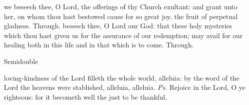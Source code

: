\secret
{} we beseech thee, O Lord, the offerings of thy Church exultant: and grant unto her, on whom thou hast bestowed cause for so great joy, the fruit of perpetual gladness. Through.
\postcommunion
{} beseech thee, O Lord our God: that these holy mysteries which thou hast given us for the assurance of our redemption; may avail for our healing both in this life and in that which is to come. Through.

\label{EasterII}
\begin{inhead}
    {Semidouble}
\end{inhead}
\par\noindent
{}


\properantiphonfix

\introit
{} loving-kindness of the Lord filleth the whole world, alleluia: by the word of the Lord the heavens were stablished, alleluia, alleluia. \textit{Ps.} Rejoice in the Lord, O ye righteous: for it becometh well the just to be thankful.

